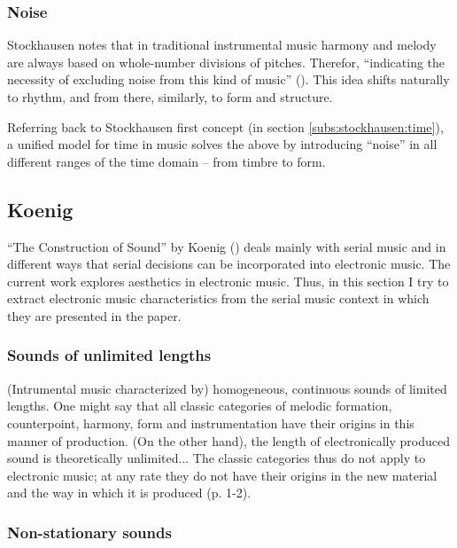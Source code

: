 \documentclass[a4paper,11pt]{article}
\newenvironment{MyShadequote}[1][]{%
    \ignorespaces%
    \begin{mdframed}[style=MyShadeQuoteStyle,#1]%
}{%
    \end{mdframed}%
    \ignorespacesafterend%
}%
\begin{document}
\subsubsection{Noise}
\label{subs:stockhausen:noise}

Stockhausen notes that in traditional instrumental music harmony and melody are always based on whole-number divisions of pitches.
Therefor, ``indicating the necessity of excluding noise from this kind of music'' (\cite[p. 47]{stockhausen}).
This idea shifts naturally to rhythm, and from there, similarly, to form and structure.

Referring back to Stockhausen first concept (in section \ref{subs:stockhausen:time}), a unified model for time in music solves the above by introducing ``noise'' in all different ranges of the time domain -- from timbre to form.

\subsection{Koenig}
\label{sub:eshtetic_koenig}

``The Construction of Sound'' by Koenig (\cite*{koenig}) deals mainly with serial music and in different ways that serial decisions can be incorporated into electronic music.
The current work explores aesthetics in electronic music.
Thus, in this section I try to extract electronic music characteristics from the serial music context in which they are presented in the paper.

\subsubsection{Sounds of unlimited lengths}
\label{subs:koenig:lengths}

\begin{MyShadequote}
  (Intrumental music characterized by) homogeneous, continuous sounds of limited lengths.
  One might say that all classic categories of melodic formation, counterpoint, harmony, form and instrumentation have their origins in this manner of production.
  (On the other hand), the length of electronically produced sound is theoretically unlimited...
  The classic categories thus do not apply to electronic music;
  at any rate they do not have their origins in the new material and the way in which it is produced (p. 1-2).
\end{MyShadequote}

\subsubsection{Non-stationary sounds}
\label{subs:koenig:nonstationary}
\end{document}
